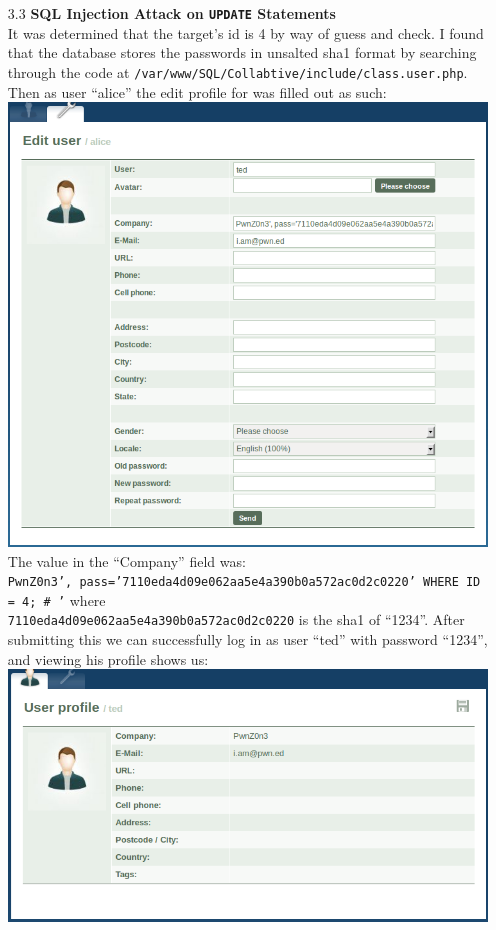 \documentclass[11pt, letterpaper]{article}
\newcommand{\code}[1]{\texttt{#1}}
\begin{document}
\begin{itemize}
\begin{itemize}
            \item[3.3 ]\textbf{SQL Injection Attack on \code{UPDATE} Statements}\\
                It was determined that the target's id is 4 by way of guess and check. I found that the database stores the passwords in unsalted sha1 format by searching through the code at \code{/var/www/SQL/Collabtive/include/class.user.php}. Then as user ``alice'' the edit profile for was filled out as such:\\
                \includegraphics[scale=0.5]{sql-inject-screenshot1}\\
                The value in the ``Company'' field was: \\\code{PwnZ0n3', pass='7110eda4d09e062aa5e4a390b0a572ac0d2c0220' WHERE ID = 4; \# '} where \\\code{7110eda4d09e062aa5e4a390b0a572ac0d2c0220} is the sha1 of ``1234''. After submitting this we can successfully log in as user ``ted'' with password ``1234'', and viewing his profile shows us:\\
                \includegraphics[scale=0.5]{sql-inject-screenshot2}\\

\end{itemize}
\end{itemize}
\end{document}
